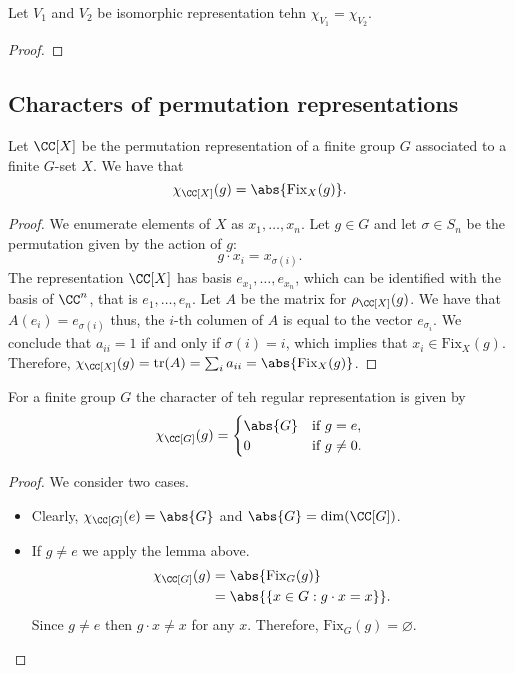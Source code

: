 \documentclass[12pt, a4paper]{article}
\begin{document}
\begin{lemma}
    Let \(V_1\) and \(V_2\) be isomorphic representation tehn \(\chi_{V_1}=\chi_{V_2}\).
\end{lemma}

\begin{proof}
\end{proof}

\subsection{Characters of permutation representations}

\begin{lemma}
    Let \(\CC[X]\) be the permutation representation of a finite group \(G\) associated to a finite \(G\)-set \(X\). We have that 
    \[\chi_{\CC[X]}(g)=\abs{\text{Fix}_X(g)}.\]
\end{lemma}

\begin{proof}
    We enumerate elements of \(X\) as \(x_1,\ldots,x_n\). Let \(g\in G\) and let \(\sigma\in S_n\) be the permutation given by the action of \(g\): 
    \[g\cdot x_i = x_{\sigma(i)}.\]
    The representation \(\CC[X]\) has basis \(e_{x_1},\ldots,e_{x_n}\), which can be identified with the basis of \(\CC^n\), that is \(e_1,\ldots,e_n\). Let \(A\) be the matrix for \(\rho_\CC[X](g)\). We have that \(A(e_i)=e_{\sigma(i)}\) thus, the \(i\)-th columen of \(A\) is equal to the vector \(e_{\sigma_i}\). We conclude that \(a_{ii}=1\) if and only if \(\sigma(i)=i\), which implies that \(x_i \in \text{Fix}_X(g)\). Therefore, \(\chi_{\CC[X]}(g)=\text{tr}(A)=\sum_i a_{ii} =\abs{\text{Fix}_X(g)}\).
\end{proof}

\begin{mdprop}
    For a finite group \(G\) the character of teh regular representation is given by 
    \[\chi_{\CC[G]}(g) = \begin{cases} \abs{G} &\text{if } g=e, \\ 0 &\text{if } g\neq 0.\end{cases}\]
\end{mdprop}

\begin{proof}
    We consider two cases.
    \begin{itemize}
        \item Clearly, \(\chi_{\CC[G]}(e)=\abs{G}\) and \(\abs{G}=\dim(\CC[G])\).
        \item If \(g\neq e\) we apply the lemma above.
        \[\begin{aligned}
            \chi_{\CC[G]}(g) &= \abs{\text{Fix}_G(g)} \\
            &= \abs{\left\{ x\in G : g\cdot x = x \right\}}.
        \end{aligned}\]
        Since \(g\neq e\) then \(g\cdot x \neq x\) for any \(x\). Therefore, \(\text{Fix}_G(g)=\varnothing\).
    \end{itemize}
\end{proof}
\end{document}
